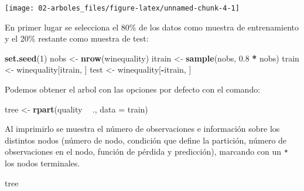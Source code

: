 \documentclass[
]{book}
\newenvironment{Shaded}{\begin{snugshade}}{\end{snugshade}}
\newcommand{\DataTypeTok}[1]{\textcolor[rgb]{0.13,0.29,0.53}{#1}}
\newcommand{\DecValTok}[1]{\textcolor[rgb]{0.00,0.00,0.81}{#1}}
\newcommand{\FloatTok}[1]{\textcolor[rgb]{0.00,0.00,0.81}{#1}}
\newcommand{\KeywordTok}[1]{\textcolor[rgb]{0.13,0.29,0.53}{\textbf{#1}}}
\newcommand{\NormalTok}[1]{#1}
\newcommand{\OperatorTok}[1]{\textcolor[rgb]{0.81,0.36,0.00}{\textbf{#1}}}
\newcommand{\StringTok}[1]{\textcolor[rgb]{0.31,0.60,0.02}{#1}}
\theoremstyle{break}
\theoremstyle{definition}
\theoremstyle{definition}
\theoremstyle{definition}
\theoremstyle{remark}
\begin{document}
\begin{Shaded}
\end{Shaded}

\begin{center}\texttt{[image: 02-arboles\_files/figure-latex/unnamed-chunk-4-1]} \end{center}

En primer lugar se selecciona el 80\% de los datos como muestra de entrenamiento y el 20\% restante como muestra de test:

\begin{Shaded}
\begin{Highlighting}[]
\KeywordTok{set.seed}\NormalTok{(}\DecValTok{1}\NormalTok{)}
\NormalTok{nobs <-}\StringTok{ }\KeywordTok{nrow}\NormalTok{(winequality)}
\NormalTok{itrain <-}\StringTok{ }\KeywordTok{sample}\NormalTok{(nobs, }\FloatTok{0.8} \OperatorTok{*}\StringTok{ }\NormalTok{nobs)}
\NormalTok{train <-}\StringTok{ }\NormalTok{winequality[itrain, ]}
\NormalTok{test <-}\StringTok{ }\NormalTok{winequality[}\OperatorTok{-}\NormalTok{itrain, ]}
\end{Highlighting}
\end{Shaded}

Podemos obtener el arbol con las opciones por defecto con el comando:

\begin{Shaded}
\begin{Highlighting}[]
\NormalTok{tree <-}\StringTok{ }\KeywordTok{rpart}\NormalTok{(quality }\OperatorTok{~}\StringTok{ }\NormalTok{., }\DataTypeTok{data =}\NormalTok{ train)}
\end{Highlighting}
\end{Shaded}

Al imprimirlo se muestra el número de observaciones e información
sobre los distintos nodos (número de nodo, condición que define la partición,
número de observaciones en el nodo, función de pérdida y predicción),
marcando con un \texttt{*} los nodos terminales.

\begin{Shaded}
\begin{Highlighting}[]
\NormalTok{tree}
\end{Highlighting}
\end{Shaded}
\end{document}

